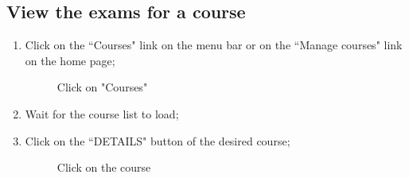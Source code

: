 \documentclass[ManualeUtente]{subfiles}
\begin{document}
	\subsection{View the exams for a course}
	\begin{enumerate}
		\item Click on the \textquotedblleft Courses" link on the menu bar or on the \textquotedblleft Manage courses" link on the home page;
		\begin{figure}[H]
			\centering
			\caption{Click on "Courses"}
			\label{fig:Click on "Courses"}
		\end{figure}
		\item Wait for the course list to load;
		\item Click on the \textquotedblleft DETAILS" button of the desired course;
		\begin{figure}[H]
			\centering
			\caption{Click on the course}
			\label{fig:Click on the course}
		\end{figure}

\end{enumerate}
\end{document}
